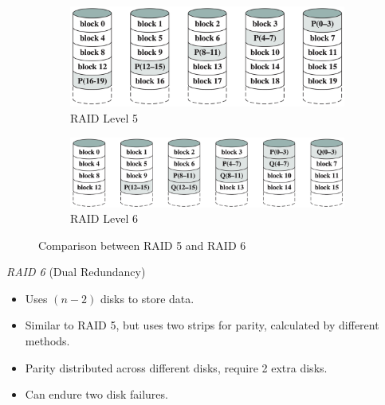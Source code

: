 \begin{figure}[H]
    \centering
    \hfill
    \begin{subfigure}{0.4\textwidth}
        \centering
        \includegraphics[width=\textwidth]{chaps/memory/external-memory/raid-level-5.png}
        \caption{RAID Level 5}
    \end{subfigure}
    \hfill
    \begin{subfigure}{0.5\textwidth}
        \centering
        \includegraphics[width=\textwidth]{chaps/memory/external-memory/raid-level-6.png}
        \caption{RAID Level 6}
    \end{subfigure}
    \hfill
    \caption{Comparison between RAID 5 and RAID 6}
\end{figure}

\emph{RAID 6} {\normalfont\large (Dual Redundancy)}

\begin{itemize}
    \item Uses $(n-2)$ disks to store data.
    \item Similar to RAID 5, but uses two strips for parity, calculated by different methods.
    \item Parity distributed across different disks, require 2 extra disks.
    \item Can endure two disk failures.
\end{itemize}

